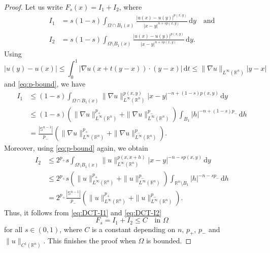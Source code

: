 \documentclass[11pt]{amsart}
\theoremstyle{plain}
\theoremstyle{definition}
\numberwithin{equation}{section}
\begin{document}
\begin{proof}
Let us write $F_{s}(x) = I_{1} + I_{2}$, where
\begin{equation*}
\begin{split}
I_{1} &= s(1-s) \int_{\Omega \cap B_{1}(x)} \frac{|u(x)-u(y)|^{p(x, y)}}{|x-y|^{n+sp(x, y)}} \,\mathrm{d}y \quad\text{and}\\
I_{2} &= s(1-s) \int_{\Omega \setminus B_{1}(x)} \frac{|u(x)-u(y)|^{p(x, y)}}{|x-y|^{n+sp(x, y)}} \,\mathrm{d}y.
\end{split}
\end{equation*}
Using
\begin{equation*}
|u(y)-u(x)| \leq \int_{0}^{1} |\nabla u(x+t(y-x)) \cdot (y-x)| \,\mathrm{d}t \leq \|\nabla u\|_{L^{\infty}(\mathbb{R}^{n})} |y-x|
\end{equation*}
and \eqref{eq:p-bound}, we have
\begin{equation} \label{eq:DCT-I1}
\begin{split}
I_{1}
&\leq (1-s) \int_{\Omega \cap B_{1}(x)} \|\nabla u\|_{L^{\infty}(\mathbb{R}^{n})}^{p(x, y)} |x-y|^{-n+(1-s)p(x, y)} \,\mathrm{d}y \\
&\leq (1-s) \left( \|\nabla u\|_{L^{\infty}(\mathbb{R}^{n})}^{p_{+}} +  \|\nabla u\|_{L^{\infty}(\mathbb{R}^{n})}^{p_{-}} \right) \int_{B_{1}} |h|^{-n+(1-s)p_{-}} \,\mathrm{d}h \\
&= \frac{|\mathbb{S}^{n-1}|}{p_{-}} \left( \|\nabla u\|_{L^{\infty}(\mathbb{R}^{n})}^{p_{+}} +  \|\nabla u\|_{L^{\infty}(\mathbb{R}^{n})}^{p_{-}} \right).
\end{split}
\end{equation}
Moreover, using \eqref{eq:p-bound} again, we obtain
\begin{equation} \label{eq:DCT-I2}
\begin{split}
I_{2}
&\leq 2^{p_+} s \int_{\Omega \setminus B_{1}(x)} \|u\|_{L^{\infty}(\mathbb{R}^{n})}^{p(x, x+h)} |x-y|^{-n-sp(x, y)} \,\mathrm{d}y \\
&\leq 2^{p_+} s \left( \|u\|_{L^{\infty}(\mathbb{R}^{n})}^{p_{+}} + \|u\|_{L^{\infty}(\mathbb{R}^{n})}^{p_{-}} \right) \int_{\mathbb{R}^{n} \setminus B_{1}} |h|^{-n-sp_{-}} \,\mathrm{d}h \\
&= 2^{p_{+}} \frac{|\mathbb{S}^{n-1}|}{p_{-}} \left( \|u\|_{L^{\infty}(\mathbb{R}^{n})}^{p_{+}} + \|u\|_{L^{\infty}(\mathbb{R}^{n})}^{p_{-}} \right).
\end{split}
\end{equation}
Thus, it follows from \eqref{eq:DCT-I1} and \eqref{eq:DCT-I2}
\begin{equation} \label{eq:Fs-bound}
F_{s} = I_{1} + I_{2} \leq C \quad\text{in } \Omega
\end{equation}
for all $s \in (0,1)$, where $C$ is a constant depending on $n$, $p_{+}$, $p_{-}$ and $\|u\|_{C^1(\mathbb{R}^{n})}$. This finishes the proof when $\Omega$ is bounded.


\end{proof}
\end{document}

